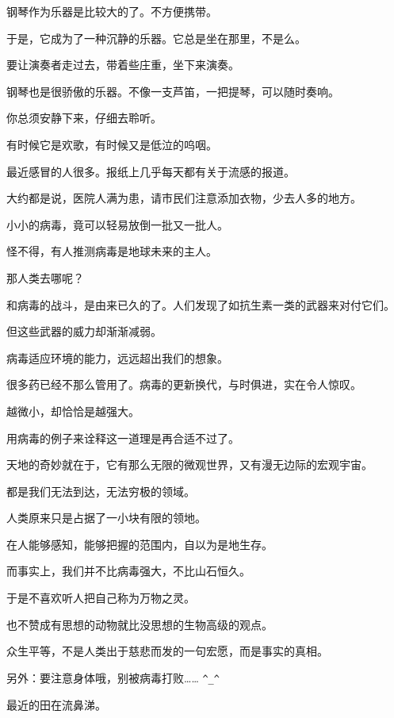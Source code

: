 \documentclass[12pt,a4paper]{article}
\def\blankrev{\vspace{1ex}}									%
\begin{document}
		\blankrev
		钢琴作为乐器是比较大的了。不方便携带。\par
		于是，它成为了一种沉静的乐器。它总是坐在那里，不是么。\par
		要让演奏者走过去，带着些庄重，坐下来演奏。\par
		钢琴也是很骄傲的乐器。不像一支芦笛，一把提琴，可以随时奏响。\par
		你总须安静下来，仔细去聆听。\par
		有时候它是欢歌，有时候又是低泣的呜咽。

	\endwriting



		最近感冒的人很多。报纸上几乎每天都有关于流感的报道。\par
		大约都是说，医院人满为患，请市民们注意添加衣物，少去人多的地方。\par
		小小的病毒，竟可以轻易放倒一批又一批人。\par
		怪不得，有人推测病毒是地球未来的主人。\par
		那人类去哪呢？\par
		和病毒的战斗，是由来已久的了。人们发现了如抗生素一类的武器来对付它们。\par
		但这些武器的威力却渐渐减弱。\par
		病毒适应环境的能力，远远超出我们的想象。\par
		很多药已经不那么管用了。病毒的更新换代，与时俱进，实在令人惊叹。\par
		越微小，却恰恰是越强大。\par
		用病毒的例子来诠释这一道理是再合适不过了。\par
		天地的奇妙就在于，它有那么无限的微观世界，又有漫无边际的宏观宇宙。\par
		都是我们无法到达，无法穷极的领域。\par
		人类原来只是占据了一小块有限的领地。\par
		在人能够感知，能够把握的范围内，自以为是地生存。\par
		而事实上，我们并不比病毒强大，不比山石恒久。\par
		于是不喜欢听人把自己称为万物之灵。\par
		也不赞成有思想的动物就比没思想的生物高级的观点。\par
		众生平等，不是人类出于慈悲而发的一句宏愿，而是事实的真相。

		另外：要注意身体哦，别被病毒打败…… \verb|^_^|\par
		最近的田在流鼻涕。

	\endwriting
\end{document}
